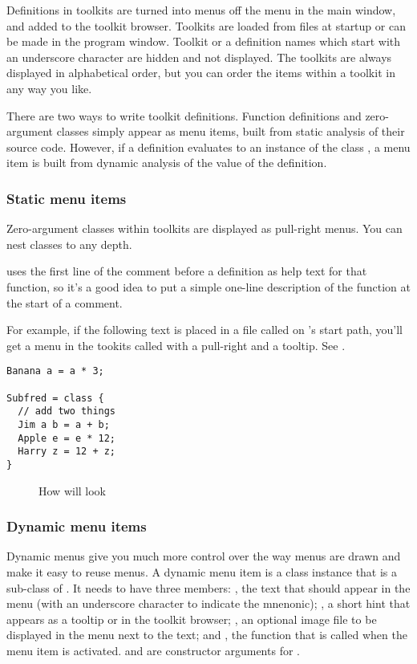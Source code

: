 Definitions in toolkits are turned into menus off the  menu
in the main window, and added to the toolkit browser. Toolkits are loaded
from files at startup or can be made in the program window.
Toolkit or a definition names which start with
an underscore character are hidden and not displayed. The toolkits are always
displayed in alphabetical order, but you can order the items within a toolkit
in any way you like. 

There are two ways to write toolkit definitions. Function definitions and
zero-argument classes simply appear as menu items, built from static analysis
of their source code. However, if a definition evaluates to an instance of the
class , a menu item is built from dynamic analysis of the value of
the definition.

\subsubsection{Static menu items}

Zero-argument classes within toolkits are displayed
as pull-right menus. You can nest classes to any depth. 

\nip{} uses the first line of the comment before a definition as
help text for that function, so it's a good idea to put a simple one-line
description of the function at the start of a comment.

For example, if the following text is placed in a file called 
on \nip{}'s start path, you'll get a menu in the tookits called  with
a pull-right and a tooltip. See .

\begin{verbatim}
Banana a = a * 3;

Subfred = class { 
  // add two things
  Jim a b = a + b;
  Apple e = e * 12;
  Harry z = 12 + z;
}
\end{verbatim}

\begin{figure}
\caption{How  will look}
\end{figure}

\subsubsection{Dynamic menu items}

Dynamic menus give you much more control over the way menus are drawn and make
it easy to reuse menus. A dynamic menu item is a class instance that is a
sub-class of . It needs to have three members: , the
text that should appear in the menu (with an underscore character to indicate
the mnenonic); , a short hint that appears as a tooltip or in
the toolkit browser; , an optional image file to be displayed in the 
menu next to the text; and , the function that is called when
the menu item is activated.  and  are constructor
arguments for .


